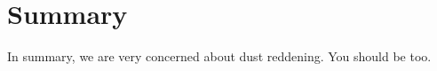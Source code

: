 \documentclass[twocolumn]{aastex61}
\begin{document}
\section{Summary\label{sec_summary}}

In summary, we are very concerned about dust reddening.  You should be too.

\acknowledgments




\vspace{5mm}




{}
\end{document}
